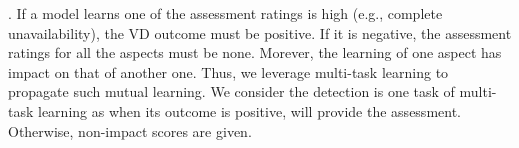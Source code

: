 \vspace{1pt}
. If a model learns one of the assessment ratings is
high (e.g., complete unavailability), the VD outcome must be
positive. If it is negative, the assessment ratings for all the
aspects must be none. Morever, the learning of one aspect has impact
on that of another one. Thus, we leverage multi-task learning to
propagate such mutual learning. We consider the detection is
one task of multi-task learning as when its outcome is
positive, {\tool} will provide the assessment. Otherwise, non-impact
scores are given.



